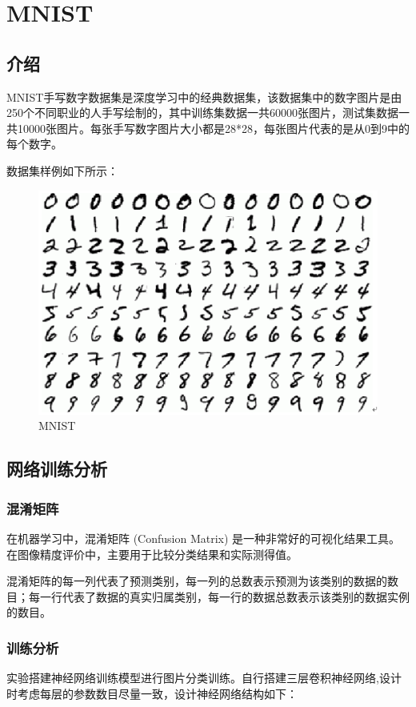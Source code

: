 \documentclass[12pt]{article}
\begin{document}
	\section{MNIST}
	
	\subsection{介绍}
	
	MNIST手写数字数据集是深度学习中的经典数据集，该数据集中的数字图片是由250个不同职业的人手写绘制的，其中训练集数据一共60000张图片，测试集数据一共10000张图片。每张手写数字图片大小都是28*28，每张图片代表的是从0到9中的每个数字。
	
	数据集样例如下所示：
	
	\begin{figure}[H]
		\centering
		\includegraphics[width=4.5in]{./images/mnistexample.png}
		\centering
		\caption{MNIST}
	\end{figure}
	
	\subsection{网络训练分析}
	
	\subsubsection{混淆矩阵}
	
	在机器学习中，混淆矩阵 (Confusion Matrix) 是一种非常好的可视化结果工具。在图像精度评价中，主要用于比较分类结果和实际测得值。
	
	混淆矩阵的每一列代表了预测类别，每一列的总数表示预测为该类别的数据的数目；每一行代表了数据的真实归属类别，每一行的数据总数表示该类别的数据实例的数目。
	
	\subsubsection{训练分析}
	实验搭建神经网络训练模型进行图片分类训练。自行搭建三层卷积神经网络,设计时考虑每层的参数数目尽量一致，设计神经网络结构如下：
	
\end{document}
